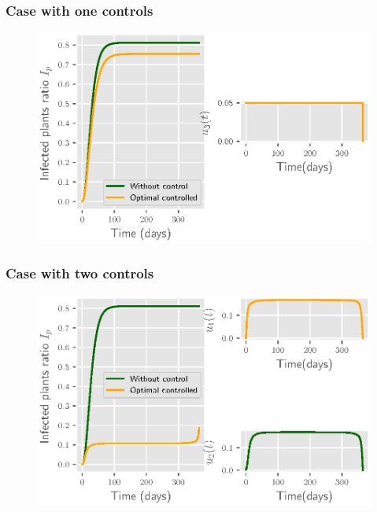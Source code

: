	\begin{frame}
		\frametitle{Case with one controls}
		\begin{figure}
			\centering	
			\includegraphics[scale=0.5]{Feathergraphics/one_control_simulation_1.eps}
		\end{figure}	
	\end{frame}
	\begin{frame}
		\frametitle{Case with two controls}
		\begin{figure}
			\centering	
			\includegraphics[scale=0.5]{Feathergraphics/two_control_simulation_1.eps}
		\end{figure}	
	\end{frame}
